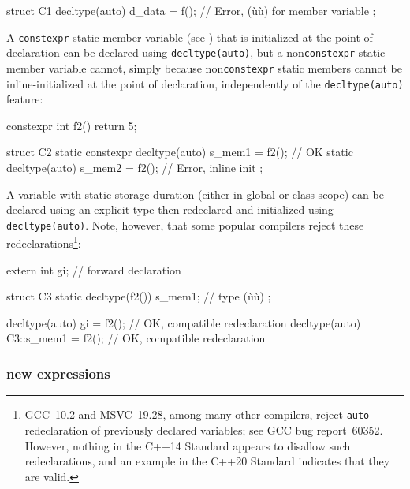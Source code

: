 \begin{emcppslisting}
struct C1
{
    decltype(auto) d_data = f();  // Error, (ù{}ù) for member variable
};
\end{emcppslisting}
    

A \lstinline!constexpr! static member variable (see
) that is initialized at the point of
declaration can be declared using \lstinline!decltype(auto)!, but a
non\lstinline!constexpr! static member variable cannot, simply because
non\lstinline!constexpr! static members cannot be inline-initialized at the
point of declaration, independently of the \lstinline!decltype(auto)!
feature:

\begin{emcppslisting}[emcppsbatch=e4,emcppsstandards={c++14}]
constexpr int f2() { return 5; }

struct C2
{
    static constexpr decltype(auto) s_mem1 = f2();  // OK
    static           decltype(auto) s_mem2 = f2();  // Error, inline init
};
\end{emcppslisting}
    

A variable with static storage duration (either in global or class
scope) can be declared using an explicit type then redeclared and
initialized using \lstinline!decltype(auto)!. Note, however, that some
popular compilers reject these redeclarations{\cprotect\footnote{GCC~10.2 and MSVC~19.28, among many other compilers, reject \lstinline!auto!
redeclaration of previously declared variables; see
GCC bug report~60352. However, nothing in the C++14 Standard appears
to disallow such redeclarations, and an example in the C++20 Standard
  indicates that they are valid.}}:

\begin{emcppslisting}[emcppsbatch=e4,emcppserrorlines={8,9}]
extern int gi;  // forward declaration

struct C3
{
    static decltype(f2()) s_mem1;  // type (ù{}ù)
};

decltype(auto) gi =         f2();  // OK, compatible redeclaration
decltype(auto) C3::s_mem1 = f2();  // OK, compatible redeclaration
\end{emcppslisting}
    

\subsubsection[\lstinline!new! expressions]{{\SubsubsecCode new} expressions}\label{new-expressions}


